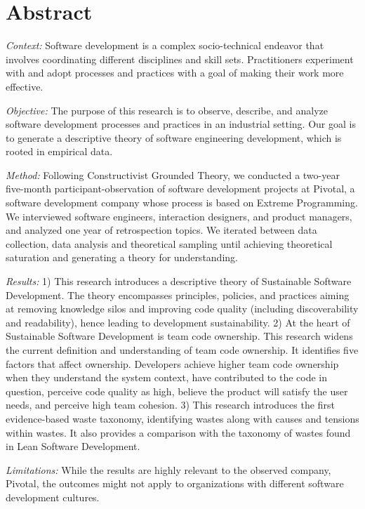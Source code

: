 
\newpage
\section*{Abstract}
\textit{Context:} Software development is a complex socio-technical endeavor that involves coordinating different disciplines and skill sets. Practitioners experiment with and adopt processes and practices with a goal of making their work more effective.

\textit{Objective:} The purpose of this research is to observe, describe, and analyze software development processes and practices in an industrial setting. Our goal is to generate a descriptive theory of software engineering development, which is rooted in empirical data.

\textit{Method:} Following Constructivist Grounded Theory, we conducted a two-year five-month participant-observation of \numberOfObservedProjects{} software development projects at Pivotal, a software development company whose process is based on Extreme Programming. We interviewed \numberOfInterviews{} software engineers, interaction designers, and product managers, and analyzed one year of retrospection topics. We iterated between data collection, data analysis and theoretical sampling until achieving theoretical saturation and generating a theory for understanding.

\textit{Results:} 1) This research introduces a descriptive theory of Sustainable Software Development. The theory encompasses principles, policies, and practices aiming at removing knowledge silos and improving code quality (including discoverability and readability), hence leading to development sustainability. 2) At the heart of Sustainable Software Development is team code ownership. This research widens the current definition and understanding of team code ownership. It identifies five factors that affect ownership. Developers achieve higher team code ownership when they understand the system context, have contributed to the code in question, perceive code quality as high, believe the product will satisfy the user needs, and perceive high team cohesion. 3) This research introduces the first evidence-based waste taxonomy, identifying \numberOfWastes{} wastes along with causes and tensions within wastes. It also provides a comparison with the taxonomy of wastes found in Lean Software Development.

\textit{Limitations:} While the results are highly relevant to the observed company, Pivotal, the outcomes might not apply to organizations with different software development cultures.

